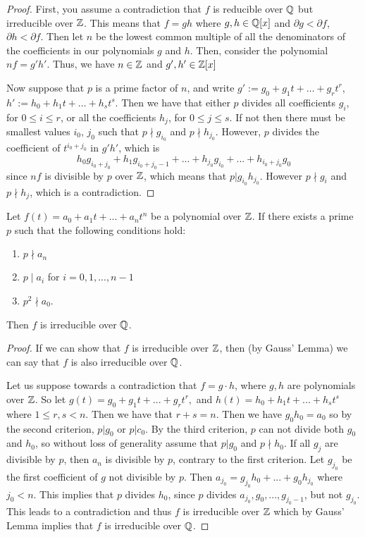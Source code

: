 \begin{proof}

First, you assume a contradiction that $f$ is reducible over $\mathbb Q$ but irreducible over $\mathbb Z$. This means that $f=gh$ where $g,h \in \mathbb Q[x]$ and $\partial g < \partial f$, $\partial h < \partial f$. Then let $n$ be the lowest common multiple of all the denominators of the coefficients in our polynomials $g$ and $h$. Then, consider the polynomial $nf = g' h'$. Thus, we have $n \in \mathbb Z$ and $g', h' \in \mathbb Z[x]$

Now suppose that $p$ is a prime factor of $n$, and write $g' := g_0 + g_1 t +\dots+ g_r t^r$, $h' := h_0 + h_1 t +\dots+ h_s t^s$. Then we have that either $p$ divides all coefficients $g_i$, for $0\leq i\leq r$, or all the coefficients $h_j$, for $0\leq j \leq s$. If not then there must be smallest values $i_0$, $j_0$ such that $p \nmid g_{i_0}$ and $p \nmid h_{j_0}$. However, $p$ divides the coefficient of $t^{i_0+j_0}$ in $g' h'$, which is
$$
h_0 g_{i_0+j_0} + h_1 g_{i_0+j_0-1} +...+ h_{j_0} g_{i_0} +...+ h_{i_0+j_0} g_0
$$
since $nf$ is divisible by $p$ over $\mathbb Z$, which means that $p |g_{i_0} h_{j_0}$. However $p \nmid g_i$ and $p \nmid h_j$, which is a contradiction.
\end{proof}

\begin{theorem} \label{thm:eisenstein}
    Let
    $f(t) = a_0 + a_1 t + ... + a_n t^n$
    be a polynomial over $\mathbb Z$. 
    If there exists a prime $p$ such that the following conditions hold:
    \begin{enumerate}
        \item $p \nmid a_n$
        \item $p \mid a_i$ for $i = {0, 1,..., n-1}$
        \item $p^2 \nmid a_0$. 
    \end{enumerate}
    Then $f$ is irreducible over $\mathbb Q$. 
\end{theorem}

\begin{proof}
If we can show that $f$ is irreducible over $\mathbb Z$, then (by Gauss' Lemma) we can say that $f$ is also irreducible over $\mathbb Q$.

Let us suppose towards a contradiction that $f=g \cdot h$, where $g,h$ are polynomials over $\mathbb Z$. So let $g(t)=g_0+g_1 t+ ... +g_r t^r,$ and $h(t)=h_0+h_1t+ ... +h_st^s$ where $1 \leq r, s < n$. Then we have that $r+s=n$. Then we have $g_0 h_0 = a_0$ so by the second criterion, $p|g_0$ or $p|c_0$. By the third criterion, $p$ can not divide both $g_0$ and $h_0$, so without loss of generality assume that $p | g_0$ and $p \nmid h_0$. If all $g_j$ are divisible by $p$, then $a_n$ is divisible by $p$, contrary to the first criterion. Let $g_{j_0}$ be the first coefficient of $g$ not divisible by $p$. Then
$
a_{j_0} = g_{j_0} h_0 + ...+ g_0 h_{j_0}
$
where $j_0 < n$. This implies that $p$ divides $h_0$, since $p$ divides $a_{j_0}, g_0,..., g_{j_0-1}$, but not $g_{j_0}$. This leads to a contradiction and thus $f$ is irreducible over $\mathbb Z$ which by Gauss' Lemma implies that $f$ is irreducible over $\mathbb Q$.
\end{proof}

